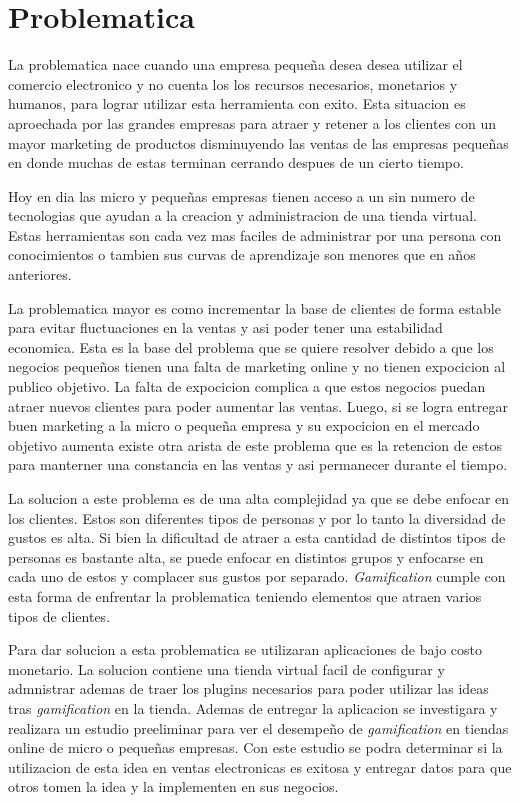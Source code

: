 \section{Problematica}

La problematica nace cuando una empresa pequeña desea desea utilizar el comercio electronico y no cuenta
los los recursos necesarios, monetarios y humanos, para lograr utilizar esta herramienta con exito. Esta situacion
es aproechada por las grandes empresas para atraer y retener a los clientes con un mayor marketing de productos
disminuyendo las ventas de las empresas pequeñas en donde muchas de estas terminan cerrando despues de un cierto 
tiempo.

Hoy en dia las micro y pequeñas empresas tienen acceso a un sin numero de tecnologias que ayudan a la creacion y
administracion de una tienda virtual. Estas herramientas son cada vez mas faciles de administrar por una persona 
con conocimientos o tambien sus curvas de aprendizaje son menores que en años anteriores.

La problematica mayor es como incrementar la base de clientes de forma estable para evitar fluctuaciones en la
 ventas y asi poder tener una estabilidad economica. Esta es la base del problema que se quiere resolver debido 
a que los negocios pequeños tienen una falta de marketing online y no tienen expocicion al publico objetivo.
 La falta de expocicion  complica a que estos negocios puedan atraer nuevos clientes para poder
aumentar las ventas. Luego, si se logra entregar buen marketing a la micro o pequeña empresa y su expocicion
en el mercado objetivo aumenta existe otra arista de este problema que es la retencion de estos para 
manterner una constancia en las ventas y asi permanecer durante el tiempo.

La solucion a este problema es de una alta complejidad ya que se debe enfocar en los clientes. Estos son diferentes
tipos de personas y por lo tanto la diversidad de gustos es alta. Si bien la dificultad de atraer a esta cantidad
de distintos tipos de personas es bastante alta, se puede enfocar en distintos grupos y enfocarse en cada uno de
estos y complacer sus gustos por separado. \emph{Gamification} cumple con esta forma de enfrentar la problematica
teniendo elementos que atraen varios tipos de clientes.

Para dar solucion a esta problematica se utilizaran aplicaciones de bajo costo monetario. La solucion contiene 
una tienda virtual facil de configurar y admnistrar ademas de traer los plugins necesarios para poder utilizar
 las ideas tras \emph{gamification} en la tienda. Ademas de entregar la aplicacion se investigara y realizara un
 estudio preeliminar para ver el desempeño de \emph{gamification} en tiendas online de micro o pequeñas empresas.
 Con este estudio se podra determinar si la utilizacion de esta idea en ventas electronicas es exitosa y 
entregar datos para que otros tomen la idea y la implementen en sus negocios.


